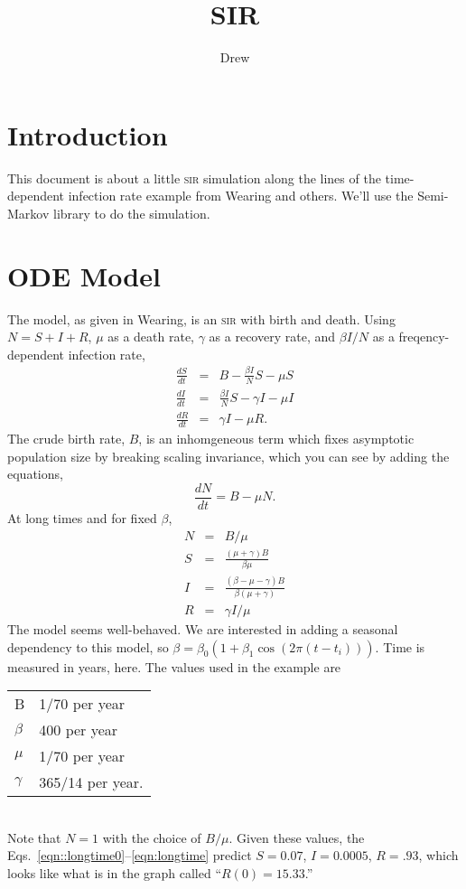 \documentclass{article}
\title{SIR}
\author{Drew}
\newcommand{\sir}{\textsc{sir}\xspace}
\begin{document}
\maketitle

\section{Introduction}
This document is about a little \sir simulation along the lines of the
time-dependent infection rate example from Wearing and others\cite{Wearing2012}.
We'll use the Semi-Markov library\cite{SemiMarkov2014} to do the simulation.

\section{ODE Model}
The model, as given in Wearing, is an \sir with birth and death.
Using $N=S+I+R$, $\mu$ as a death rate, $\gamma$ as a recovery rate,
and $\beta I/N$ as a freqency-dependent infection rate,
\begin{eqnarray}
  \frac{dS}{dt}&=& B - \frac{\beta I}{N}S-\mu S \\
  \frac{dI}{dt}&=& \frac{\beta I}{N}S-\gamma I-\mu I \\
  \frac{dR}{dt}&=& \gamma I - \mu R.
\end{eqnarray}
The crude birth rate, $B$, is an inhomgeneous term which fixes
asymptotic population size by breaking
scaling invariance, which you can see by adding the equations,
\begin{equation}
  \frac{dN}{dt}=B-\mu N.
\end{equation}
At long times and for fixed $\beta$,
\begin{eqnarray}
  N & = & B/\mu \label{eqn::longtime0}\\
  S & = & \frac{(\mu+\gamma)B}{\beta \mu} \\
  I & = & \frac{(\beta-\mu-\gamma)B}{\beta(\mu+\gamma)} \\
  R & = & \gamma I/\mu\label{eqn:longtime}
\end{eqnarray}
The model seems well-behaved. We are interested in adding a seasonal
dependency to this model, so $\beta=\beta_0(1+\beta_1 \cos(2\pi (t-t_i))).$
Time is measured in years, here. The values used in the example
are \\
\begin{tabular}{ll}
B & 1/70 per year \\
$\beta$ & 400 per year \\
$\mu$ & 1/70 per year \\
$\gamma$ & 365/14 per year.
\end{tabular} \\
Note that $N=1$ with the choice of $B/\mu$. Given these values, the
Eqs.~\ref{eqn::longtime0}--\ref{eqn:longtime} predict
$S=0.07$, $I=0.0005$, $R=.93$, which looks like what is in the graph
called ``$R(0)=15.33$.''
\end{document}
